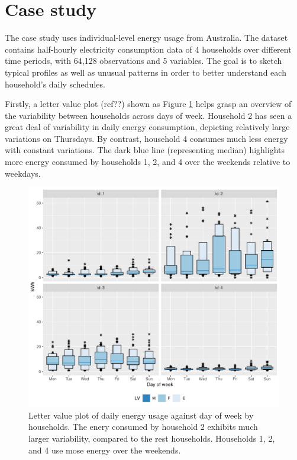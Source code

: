 \documentclass[12pt]{article}
\begin{document}
\hypertarget{case-study}{%
\section{Case study}\label{case-study}}

\label{sec:case}

The case study uses individual-level energy usage from Australia. The
dataset contains half-hourly electricity consumption data of 4
households over different time periods, with 64,128 observations and 5
variables. The goal is to sketch typical profiles as well as unusual
patterns in order to better understand each household's daily schedules.

Firstly, a letter value plot (ref??) shown as Figure \ref{fig:dow} helps
grasp an overview of the variability between households across days of
week. Household 2 has seen a great deal of variability in daily energy
consumption, depicting relatively large variations on Thursdays. By
contrast, household 4 consumes much less energy with constant
variations. The dark blue line (representing median) highlights more
energy consumed by households 1, 2, and 4 over the weekends relative to
weekdays.

\begin{figure}

{\centering \includegraphics[width=\textwidth]{figure/dow-1} 

}

\caption{Letter value plot of daily energy usage against day of week by households. The enery consumed by household 2 exhibits much larger variability, compared to the rest households. Households 1, 2, and 4 use mose energy over the weekends.}\label{fig:dow}
\end{figure}
\end{document}
